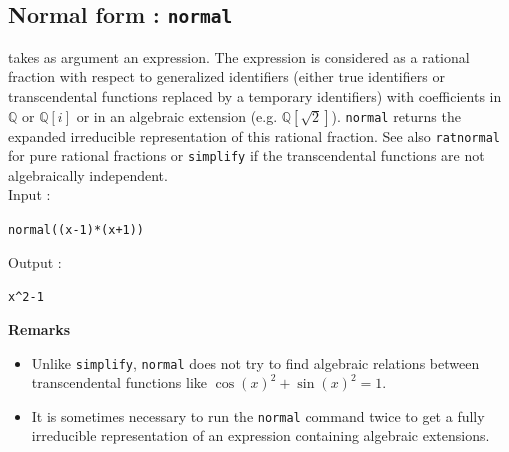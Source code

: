 \documentclass[a4paper,11pt]{book}
\begin{document}
\subsection{Normal form : {\tt normal}}
 takes as argument an expression. 
The expression is considered as a rational fraction with respect 
to generalized identifiers
(either true identifiers or transcendental functions replaced by 
a temporary identifiers) with coefficients in $\mathbb Q$ or $\mathbb Q[i]$
or in an algebraic extension (e.g. $\mathbb Q[\sqrt{2}]$).
{\tt normal} returns the expanded irreducible representation
of this rational fraction. See also {\tt ratnormal} for pure rational
fractions or {\tt simplify} if the transcendental functions are
not algebraically independent.\\
Input :  
\begin{center}{\tt normal((x-1)*(x+1))}\end{center}
Output :
 \begin{center}{\tt x\verb|^|2-1}\end{center}  
{\bf Remarks}
\begin{itemize}
\item Unlike {\tt simplify},
{\tt normal} does not try to find algebraic relations between
transcendental functions like $\cos(x)^2+\sin(x)^2=1$.
\item
It is sometimes necessary to run the {\tt normal} command twice to
get a fully irreducible representation of an expression
containing algebraic extensions.
\end{itemize}
\end{document}

